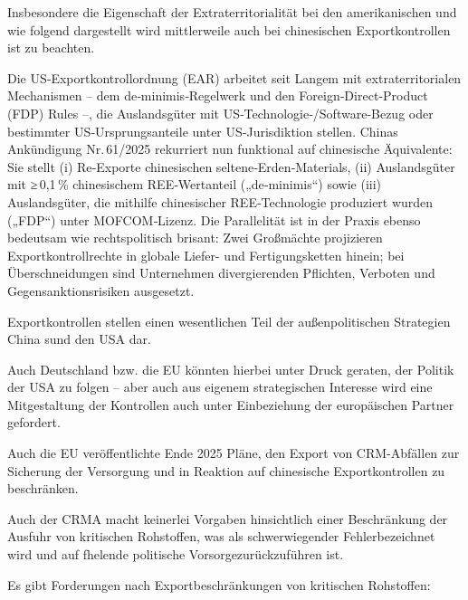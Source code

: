 \documentclass[12pt,a4paper,oneside]{book} %
\begin{document}
Insbesondere die Eigenschaft der Extraterritorialität bei den amerikanischen und wie folgend dargestellt wird mittlerweile auch bei chinesischen Exportkontrollen ist zu beachten.

Die US‑Exportkontrollordnung (EAR) arbeitet seit Langem mit extraterritorialen Mechanismen – dem de‑minimis‑Regelwerk und den Foreign‑Direct‑Product (FDP) Rules –, die Auslandsgüter mit US‑Technologie‑/Software‑Bezug oder bestimmter US‑Ursprungsanteile unter US‑Jurisdiktion stellen.  Chinas Ankündigung Nr. 61/2025 rekurriert nun funktional auf chinesische Äquivalente: Sie stellt (i) Re‑Exporte chinesischen seltene‑Erden‑Materials, (ii) Auslandsgüter mit ≥ 0,1 \% chinesischem REE‑Wertanteil („de‑minimis“) sowie (iii) Auslandsgüter, die mithilfe chinesischer REE‑Technologie produziert wurden („FDP“) unter MOFCOM‑Lizenz.  Die Parallelität ist in der Praxis ebenso bedeutsam wie rechtspolitisch brisant: Zwei Großmächte projizieren Exportkontrollrechte in globale Liefer- und Fertigungsketten hinein; bei Überschneidungen sind Unternehmen divergierenden Pflichten, Verboten und Gegensanktionsrisiken ausgesetzt.

Exportkontrollen stellen einen wesentlichen Teil der außenpolitischen Strategien China sund den USA dar.

Auch Deutschland bzw. die EU könnten hierbei unter Druck geraten, der Politik der USA zu folgen -- aber auch aus eigenem strategischen Interesse wird eine Mitgestaltung der Kontrollen auch unter Einbeziehung der europäischen Partner gefordert.\autocite{Medunic, FiliP. Deutschland muss Exportkontrollen strategischer gestalten, DGAp Memo Nr. 15, Juli 2024, S.1.}

Auch die EU veröffentlichte Ende 2025 Pläne, den Export von CRM-Abfällen zur Sicherung der Versorgung und in Reaktion auf chinesische Exportkontrollen zu beschränken.

Auch der CRMA macht keinerlei Vorgaben hinsichtlich einer Beschränkung der Ausfuhr von kritischen Rohstoffen, was als \glqq schwerwiegender Fehler\grqq bezeichnet wird und auf \glqq fhelende politische Vorsorge\grqq zurückzuführen ist.\autocite{Die Firmen können mit den Rohstoffen machen, was sie wollen, Sächsische Zeitung - Dresden vom 17.02.2026, Seite 24}

Es gibt Forderungen nach Exportbeschränkungen von kritischen Rohstoffen: 
\end{document}

